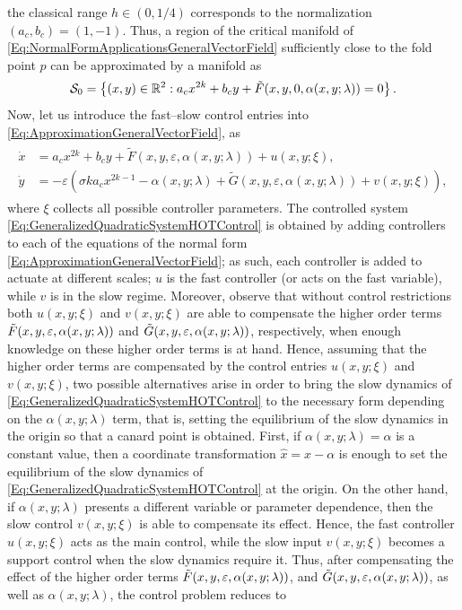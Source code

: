 \documentclass[3p]{elsarticle}
\theoremstyle{plain}
\theoremstyle{remark}
\theoremstyle{definition}
\begin{document}
the classical range $h\in(0,1/4)$ corresponds to the normalization $(a_c,b_c)=(1,-1)$. Thus, a region of the critical manifold of \eqref{Eq:NormalFormApplicationsGeneralVectorField} sufficiently close to the fold point $p$ can be approximated by a manifold as
    \begin{equation}
        \mathcal{S}_{0} = \left\{ (x,y)\in\mathbb{R}^{2}: a_{c}x^{2k} + b_{c}y + \Tilde{F}(x,y,0,\alpha(x,y;\lambda)) = 0  \right\}.
    \end{equation}
    Now, let us introduce the fast--slow control entries into \eqref{Eq:ApproximationGeneralVectorField}, as
    \begin{align}
            \begin{split}
                \dot{x} &= a_{c}x^{2k} + b_{c}y + \tilde{F}(x, y, \varepsilon, \alpha(x,y;\lambda)) + u(x,y;\xi),\\
                \dot{y} &= -\varepsilon \left( \sigma k a_{c}x^{2k-1} - \alpha(x,y;\lambda) + \tilde{G}(x, y, \varepsilon, \alpha(x,y;\lambda)) + v(x,y;\xi)\right), 
            \end{split}
            \label{Eq:GeneralizedQuadraticSystemHOTControl}
        \end{align}
    where $\xi$ collects all possible controller parameters. The controlled system \eqref{Eq:GeneralizedQuadraticSystemHOTControl} is obtained by adding controllers to each of the equations of the normal form \eqref{Eq:ApproximationGeneralVectorField}; as such, each controller is added to actuate at different scales; $u$ is the fast controller (or acts on the fast variable), while $v$ is in the slow regime. Moreover, observe that without control restrictions both $u(x,y;\xi)$ and $v(x,y;\xi)$ are able to compensate the higher order terms $\Tilde{F}(x,y,\varepsilon,\alpha(x,y;\lambda))$ and $\Tilde{G}(x,y,\varepsilon,\alpha(x,y;\lambda))$, respectively, when enough knowledge on these higher order terms is at hand. Hence, assuming that the higher order terms are compensated by the control entries $u(x,y;\xi)$ and $v(x,y;\xi)$, two possible alternatives arise in order to bring the slow dynamics of  \eqref{Eq:GeneralizedQuadraticSystemHOTControl} to the necessary form depending on the $\alpha(x,y;\lambda)$ term, that is, setting the equilibrium of the slow dynamics in the origin so that a canard point is obtained. First, if $\alpha(x,y;\lambda)=\alpha$ is a constant value, then a coordinate transformation $\hat{x} = x-\alpha$ is enough to set the equilibrium of the slow dynamics of  \eqref{Eq:GeneralizedQuadraticSystemHOTControl} at the origin. On the other hand, if $\alpha(x,y;\lambda)$ presents a different variable or parameter dependence, then the slow control $v(x,y;\xi)$ is able to compensate its effect. Hence, the fast controller $u(x,y;\xi)$ acts as the main control, while the slow input $v(x,y;\xi)$ becomes a support control when the slow dynamics require it. Thus, after compensating the effect of the higher order terms $\Tilde{F}(x,y,\varepsilon,\alpha(x,y;\lambda))$, and $\Tilde{G}(x,y,\varepsilon,\alpha(x,y;\lambda))$, as well as $\alpha(x,y;\lambda)$, the control problem reduces to
\end{document}
